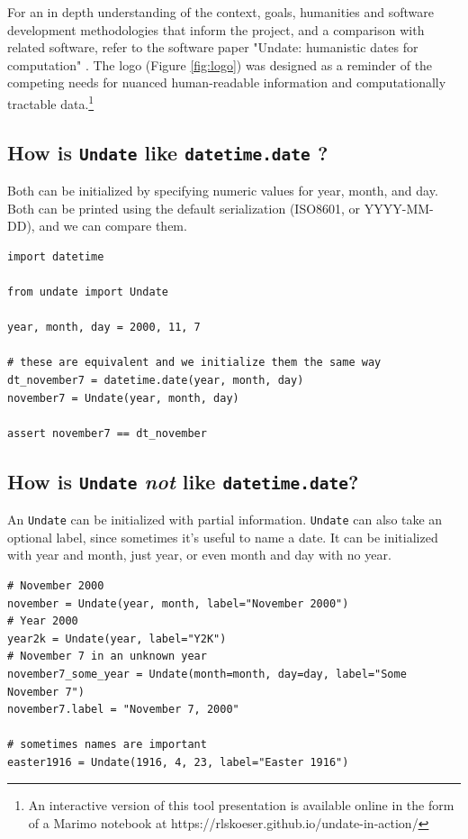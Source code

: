 \documentclass{anthology-ch}         %
\begin{document}
For an in depth understanding of the context, goals, humanities and software development methodologies that inform the project, and a comparison with related software, refer to the software paper "Undate: humanistic dates for computation" \cite{koeser_princeton_2025}.  The logo (Figure \ref{fig:logo}) was designed as a reminder of the competing needs for nuanced human-readable information and computationally tractable data.\footnote{An interactive version of this tool presentation is available online in the form of a Marimo notebook at https://rlskoeser.github.io/undate-in-action/}

\subsection{How is \texttt{Undate} like \texttt{datetime.date} ?} \label{sec:intro_details}


Both can be initialized by specifying numeric values for year, month, and day. Both can be printed using the default serialization (ISO8601, or YYYY-MM-DD), and we can compare them.

\begin{verbatim}
import datetime

from undate import Undate

year, month, day = 2000, 11, 7

# these are equivalent and we initialize them the same way
dt_november7 = datetime.date(year, month, day)
november7 = Undate(year, month, day)

assert november7 == dt_november
\end{verbatim}


\subsection{How is \texttt{Undate} \textit{not} like \texttt{datetime.date}?}

An \texttt{Undate} can be initialized with partial information.  \texttt{Undate} can also take an optional label, since sometimes it's useful to name a date.  It can be initialized with year and month, just year, or even month and day with no year.

\begin{verbatim}
# November 2000
november = Undate(year, month, label="November 2000")
# Year 2000
year2k = Undate(year, label="Y2K")
# November 7 in an unknown year
november7_some_year = Undate(month=month, day=day, label="Some November 7")
november7.label = "November 7, 2000"

# sometimes names are important
easter1916 = Undate(1916, 4, 23, label="Easter 1916")
\end{verbatim}
\end{document}
